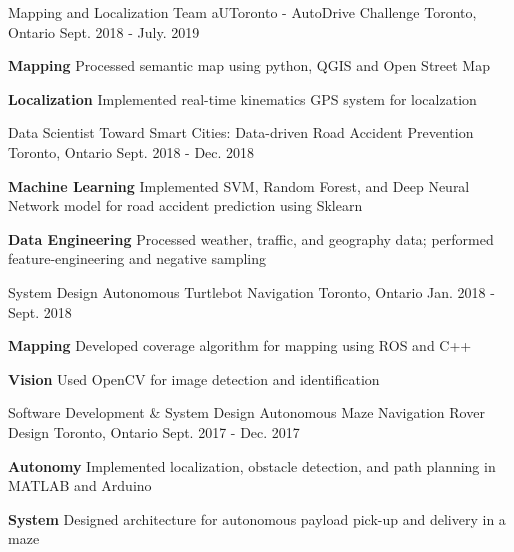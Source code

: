 \begin{cventries}
  \cventry
  {Mapping and Localization Team}
  {aUToronto - AutoDrive Challenge}
  {Toronto, Ontario}
  {Sept. 2018 - July. 2019}
  {
    \begin{cvitems}
      \item {\textbf{Mapping} Processed semantic map using python, QGIS and Open Street Map}
      \item {\textbf{Localization} Implemented real-time kinematics GPS system for localzation}
    \end{cvitems}
  }
  \cventry
  {Data Scientist}
  {Toward Smart Cities: Data-driven Road Accident Prevention}
  {Toronto, Ontario}
  {Sept. 2018 - Dec. 2018}
  {
    \begin{cvitems}
      \item {\textbf{Machine Learning} Implemented SVM, Random Forest, and Deep Neural Network model for road accident prediction using Sklearn}
      \item {\textbf{Data Engineering} Processed weather, traffic, and geography data; performed feature-engineering and negative sampling}
    \end{cvitems}
  }
  \cventry
  {System Design}
  {Autonomous Turtlebot Navigation}
  {Toronto, Ontario}
  {Jan. 2018 - Sept. 2018}
  {
    \begin{cvitems}
      \item {\textbf{Mapping} Developed coverage algorithm for mapping using ROS and C++}
      \item {\textbf{Vision} Used OpenCV for image detection and identification}
    \end{cvitems}
  }
    \cventry
    {Software Development \& System Design}
    {Autonomous Maze Navigation Rover Design}
    {Toronto, Ontario}
    {Sept. 2017 - Dec. 2017}
    {
      \begin{cvitems}
        \item { \textbf{Autonomy} Implemented localization, obstacle detection, and path planning in MATLAB and Arduino}
        \item { \textbf{System} Designed architecture for autonomous payload pick-up and delivery in a maze}
      \end{cvitems}
    }
\end{cventries}
